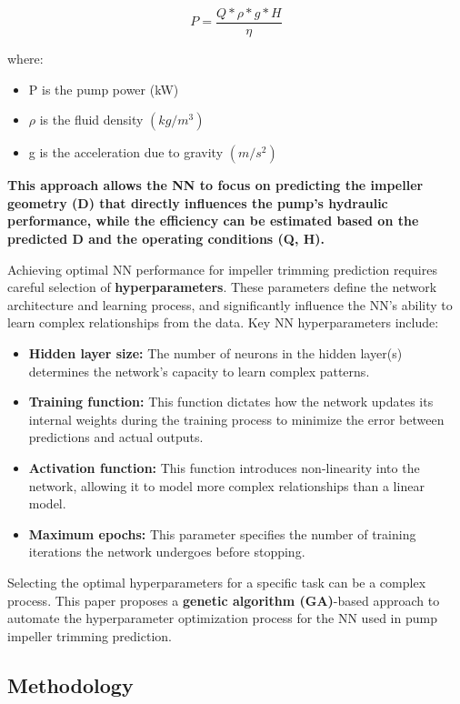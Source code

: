 \documentclass[
  super,
  review,
  3p]{elsarticle}
\providecommand{\tightlist}{%
  \setlength{\itemsep}{0pt}\setlength{\parskip}{0pt}}\usepackage{longtable,booktabs,array}
\begin{document}
\[
P = \frac{Q* \rho *g*H}{\eta} 
\]

where:

\begin{itemize}
\tightlist
\item
  P is the pump power (kW)
\item
  \(\rho\) is the fluid density \((kg/m^3)\)
\item
  g is the acceleration due to gravity \((m/s^2)\)
\end{itemize}

\textbf{This approach allows the NN to focus on predicting the impeller
geometry (D) that directly influences the pump's hydraulic performance,
while the efficiency can be estimated based on the predicted D and the
operating conditions (Q, H).}

Achieving optimal NN performance for impeller trimming prediction
requires careful selection of \textbf{hyperparameters}. These parameters
define the network architecture and learning process, and significantly
influence the NN's ability to learn complex relationships from the data.
Key NN hyperparameters include:

\begin{itemize}
\tightlist
\item
  \textbf{Hidden layer size:} The number of neurons in the hidden
  layer(s) determines the network's capacity to learn complex patterns.
\item
  \textbf{Training function:} This function dictates how the network
  updates its internal weights during the training process to minimize
  the error between predictions and actual outputs.
\item
  \textbf{Activation function:} This function introduces non-linearity
  into the network, allowing it to model more complex relationships than
  a linear model.
\item
  \textbf{Maximum epochs:} This parameter specifies the number of
  training iterations the network undergoes before stopping.
\end{itemize}

Selecting the optimal hyperparameters for a specific task can be a
complex process. This paper proposes a \textbf{genetic algorithm
(GA)}-based approach to automate the hyperparameter optimization process
for the NN used in pump impeller trimming prediction.

\subsection{Methodology}\label{methodology}
\end{document}
